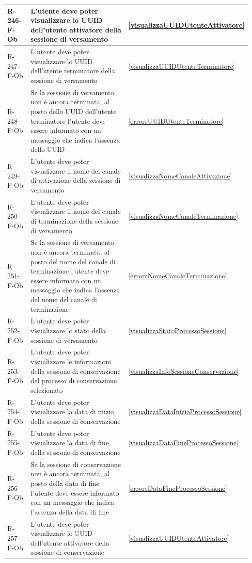 \begin{longtable}{|p{2.5cm}|p{9.5cm}|p{2.5cm}|}
\hline
R-246-F-Ob & L'utente deve poter visualizzare lo UUID dell'utente attivatore della sessione di versamento & \ref{visualizzaUUIDUtenteAttivatore} \\
\hline
R-247-F-Ob & L'utente deve poter visualizzare lo UUID dell'utente terminatore della sessione di versamento & \ref{visualizzaUUIDUtenteTerminatore} \\
\hline
R-248-F-Ob & Se la sessione di versamento non è ancora terminata, al posto dello UUID dell'utente terminatore l'utente deve essere informato con un messaggio che indica l'assenza dello UUID & \ref{erroreUUIDUtenteTerminatore} \\
\hline
R-249-F-Ob & L'utente deve poter visualizzare il nome del canale di attivazione della sessione di versamento & \ref{visualizzaNomeCanaleAttivazione} \\
\hline
R-250-F-Ob & L'utente deve poter visualizzare il nome del canale di terminazione della sessione di versamento & \ref{visualizzaNomeCanaleTerminazione} \\
\hline
R-251-F-Ob & Se la sessione di versamento non è ancora terminata, al posto del nome del canale di terminazione l'utente deve essere informato con un messaggio che indica l'assenza del nome del canale di terminazione & \ref{erroreNomeCanaleTerminazione} \\
\hline
R-252-F-Ob & L'utente deve poter visualizzare lo stato della sessione di versamento & \ref{visualizzaStatoProcessoSessione} \\
\hline
R-253-F-Ob & L'utente deve poter visualizzare le informazioni della sessione di conservazione del processo di conservazione selezionato & \ref{visualizzaInfoSessioneConservazione} \\
\hline
R-254-F-Ob & L'utente deve poter visualizzare la data di inizio della sessione di conservazione & \ref{visualizzaDataInizioProcessoSessione} \\
\hline
R-255-F-Ob & L'utente deve poter visualizzare la data di fine della sessione di conservazione & \ref{visualizzaDataFineProcessoSessione} \\
\hline
R-256-F-Ob & Se la sessione di conservazione non è ancora terminata, al posto della data di fine l'utente deve essere informato con un messaggio che indica l'assenza della data di fine & \ref{erroreDataFineProcessoSessione} \\
\hline
R-257-F-Ob & L'utente deve poter visualizzare lo UUID dell'utente attivatore della sessione di conservazione & \ref{visualizzaUUIDUtenteAttivatore} \\

\end{longtable}
